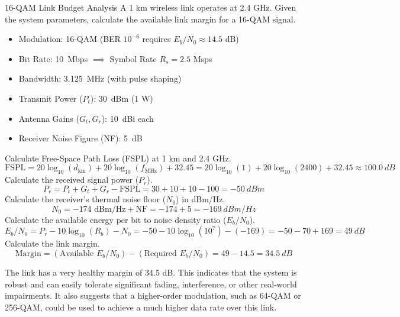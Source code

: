 \begin{workedexample}{16-QAM Link Budget Analysis}
     A 1 km wireless link operates at 2.4 GHz. Given the system parameters, calculate the available link margin for a 16-QAM signal.
    \begin{itemize}
        \item Modulation: 16-QAM (BER $10^{-6}$ requires $E_b/N_0 \approx 14.5$ dB)
        \item Bit Rate: \qty{10}{Mbps} $\implies$ Symbol Rate $R_s = 2.5$ Msps
        \item Bandwidth: \qty{3.125}{MHz} (with pulse shaping)
        \item Transmit Power ($P_t$): \qty{30}{dBm} (1 W)
        \item Antenna Gains ($G_t, G_r$): \qty{10}{dBi} each
        \item Receiver Noise Figure (NF): \qty{5}{dB}
    \end{itemize}
    \begin{derivationsteps}
        \step Calculate Free-Space Path Loss (FSPL) at 1 km and 2.4 GHz.
        \[ \text{FSPL} = 20\log_{10}(d_{\text{km}}) + 20\log_{10}(f_{\text{MHz}}) + 32.45 = 20\log_{10}(1) + 20\log_{10}(2400) + 32.45 \approx \qty{100.0}{dB} \]
        \step Calculate the received signal power ($P_r$).
        \[ P_r = P_t + G_t + G_r - \text{FSPL} = 30 + 10 + 10 - 100 = \qty{-50}{dBm} \]
        \step Calculate the receiver's thermal noise floor ($N_0$) in dBm/Hz.
        \[ N_0 = -174 \text{ dBm/Hz} + \text{NF} = -174 + 5 = \qty{-169}{dBm/Hz} \]
        \step Calculate the available energy per bit to noise density ratio ($E_b/N_0$).
        \[ E_b/N_0 = P_r - 10\log_{10}(R_b) - N_0 = -50 - 10\log_{10}(10^7) - (-169) = -50 - 70 + 169 = \qty{49}{dB} \]
        \step Calculate the link margin.
        \[ \text{Margin} = (\text{Available } E_b/N_0) - (\text{Required } E_b/N_0) = 49 - 14.5 = \qty{34.5}{dB} \]
    \end{derivationsteps}
     The link has a very healthy margin of 34.5 dB. This indicates that the system is robust and can easily tolerate significant fading, interference, or other real-world impairments. It also suggests that a higher-order modulation, such as 64-QAM or 256-QAM, could be used to achieve a much higher data rate over this link.
\end{workedexample}


